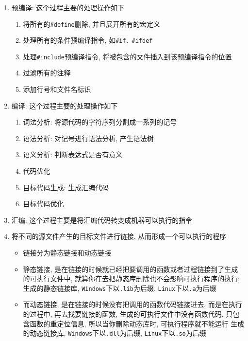 \documentclass[10pt,twoside]{ctexart}
\begin{document}
\subsubsection[{\tt malloc}和{\tt new}区别]{}
\subsubsection[ISOK:{\tt C++}从代码到可执行二进制文件的过程]{}
\begin{enumerate}
	\item 预编译: 这个过程主要的处理操作如下
	\begin{enumerate}
		\item 将所有的{\tt \#define}删除, 并且展开所有的宏定义
		\item 处理所有的条件预编译指令, 如{\tt \#if、\#ifdef}
		\item 处理{\tt \#include}预编译指令, 将被包含的文件插入到该预编译指令的位置
		\item 过滤所有的注释
		\item 添加行号和文件名标识
	\end{enumerate}
	\item 编译: 这个过程主要的处理操作如下
	\begin{enumerate}
		\item 词法分析: 将源代码的字符序列分割成一系列的记号
		\item 语法分析: 对记号进行语法分析, 产生语法树
		\item 语义分析: 判断表达式是否有意义
		\item 代码优化
		\item 目标代码生成: 生成汇编代码
		\item 目标代码优化
	\end{enumerate}
	\item 汇编: 这个过程主要是将汇编代码转变成机器可以执行的指令
	\item 将不同的源文件产生的目标文件进行链接, 从而形成一个可以执行的程序
	\begin{itemize}
		\item 链接分为静态链接和动态链接
		\item 静态链接, 是在链接的时候就已经把要调用的函数或者过程链接到了生成的可执行文件中, 
				就算你在去把静态库删除也不会影响可执行程序的执行; 生成的静态链接库, {\tt Windows}下以{\tt .lib}为后缀, 
				{\tt Linux}下以{\tt .a}为后缀
		\item 而动态链接, 是在链接的时候没有把调用的函数代码链接进去, 而是在执行的过程中, 再去找要链接的函数, 
				生成的可执行文件中没有函数代码, 只包含函数的重定位信息, 所以当你删除动态库时, 可执行程序就不能运行
				生成的动态链接库, {\tt Windows}下以{\tt .dll}为后缀, {\tt Linux}下以{\tt .so}为后缀
	\end{itemize}
\end{enumerate}
\end{document}
